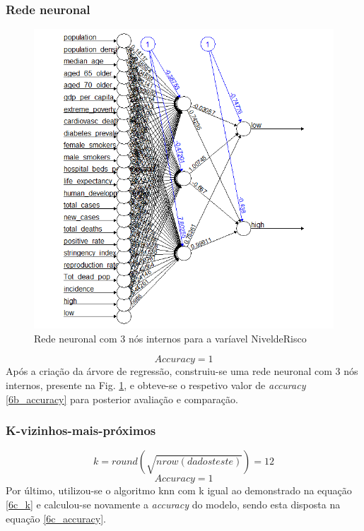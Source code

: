 \documentclass[conference]{IEEEtran}
\begin{document}
\subsubsection{Rede neuronal}
\begin{figure}[htbp]
\centerline{\includegraphics[width=0.95\columnwidth]{images/06_2.png}}
\caption{Rede neuronal com 3 nós internos para a varíavel NiveldeRisco}
\label{6b_neural}
\end{figure}
\begin{equation}
Accuracy = 1\label{6b_accuracy}
\end{equation}
Após a criação da árvore de regressão, construiu-se uma rede neuronal com 3 nós internos, presente na Fig. \ref{6b_neural}, e obteve-se o respetivo valor de \textit{accuracy} \eqref{6b_accuracy} para posterior avaliação e comparação.


\subsubsection{K-vizinhos-mais-próximos}
\begin{equation}
k = round(\sqrt{nrow(dadosteste)})=12\label{6c_k}
\end{equation}
\begin{equation}
Accuracy = 1\label{6c_accuracy}
\end{equation}
Por último, utilizou-se o algoritmo knn com k igual ao demonstrado na equação \eqref{6c_k} \cite{knn} e calculou-se novamente a \textit{accuracy} do modelo, sendo esta disposta na equação \eqref{6c_accuracy}.
\end{document}

